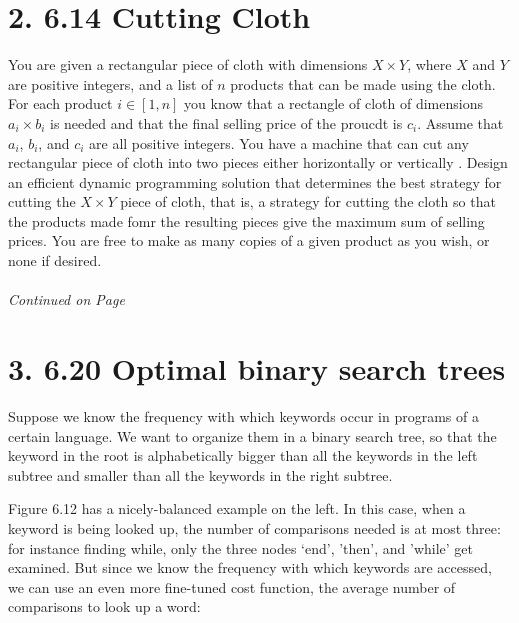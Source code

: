 \documentclass[11pt]{article}
\begin{document}
\newpage

\pagestyle{plain}

\section*{2. 6.14 Cutting Cloth}

You are given a rectangular piece of cloth with dimensions $X\times Y$, where $X$ and $Y$ are positive integers, and a list of $n$ products that can be made using the cloth. 
For each product $i \in [1,n]$ you know that a rectangle of cloth of dimensions $a_i \times b_i$ is needed and that the final selling price of the proucdt is $c_i$. Assume that $a_i$, $b_i$, and $c_i$ are all positive integers.
You have a machine that can cut any rectangular piece of cloth into two pieces either horizontally or vertically .
Design an efficient dynamic programming solution that determines the best strategy for cutting the $X\times Y$ piece of cloth, that is, a strategy for cutting the cloth so that the products made fomr the resulting pieces give the maximum sum of selling prices.
You are free to make as many copies of a given product as you wish, or none if desired.

\label{pg:end-of-p2}
%
 \paragraph{} \emph{Continued on Page \pageref{pg:p2-continuation}}

\newpage

\section*{3. 6.20 Optimal binary search trees}

Suppose we know the frequency with which keywords occur in programs of a certain language.
We want to organize them in a binary search tree, so that the keyword in the root is alphabetically bigger than all the keywords in the left subtree and smaller than all the keywords in the right subtree.

Figure 6.12 has a nicely-balanced example on the left. In this case, when a keyword is being looked up, the number of comparisons needed is at most three: for instance finding while, only the three nodes `end', 'then', and 'while' get examined.
But since we know the frequency with which keywords are accessed, we can use an even more fine-tuned cost function, the average number of comparisons to look up a word: 
\end{document}
